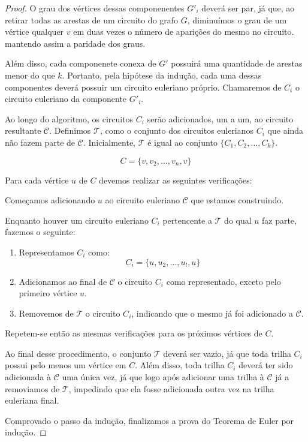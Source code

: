 \documentclass[12pt, a4paper]{article}
\begin{document}
\begin{proof}
O grau dos vértices dessas componenentes $G'_i$ deverá ser par, já que, ao retirar todas as arestas de um circuito do grafo $G$, diminuímos o grau de um vértice qualquer $v$ em duas vezes o número de aparições do mesmo no circuito. mantendo assim a paridade dos graus. 

Além disso, cada componenete conexa de $G'$ possuirá uma quantidade de arestas menor do que $k$.
Portanto, pela hipótese da indução, cada uma dessas componentes deverá possuir um circuito euleriano próprio. 
Chamaremos de $C_i$ o circuito euleriano da componente $G'_i$.

\sloppy Ao longo do algoritmo, os circuitos $C_i$ serão adicionados, um a um, ao circuito resultante $\mathcal{C}$. 
Definimos $\mathcal{T}$, como o conjunto dos circuitos eulerianos $C_i$ que ainda não fazem parte de $\mathcal{C}$. 
Inicialmente, $\mathcal{T}$ é igual ao conjunto $\{C_1, C_2, \dots, C_k\}$.


\[
	C = \{v, v_2, \dots, v_n, v\}
\]

Para cada vértice $u$ de $C$ devemos realizar as seguintes verificações:

\begin{tcolorbox}

Começamos adicionando $u$ ao circuito euleriano $\mathcal{C}$ que estamos construindo.

Enquanto houver um circuito euleriano $C_i$ pertencente a $\mathcal{T}$ do qual $u$ faz parte, fazemos o seguinte:


\begin{enumerate}
    \item Representamos $C_i$ como: 
    \[
        C_i = \{u, u_2, \dots, u_l, u\}
    \]

\item Adicionamos ao final de $\mathcal{C}$ o circuito $C_i$ como representado, exceto pelo primeiro vértice $u$. 

\item Removemos de $\mathcal{T}$ o circuito $C_i$, indicando que o mesmo já foi adicionado a $\mathcal{C}$.

\end{enumerate}

Repetem-se então as mesmas verificações para os próximos vértices de $C$.
\end{tcolorbox}


Ao final desse procedimento, o conjunto $\mathcal{T}$ deverá ser vazio, já que toda trilha $C_i$ possui pelo menos um vértice em $C$. Além disso, toda trilha $C_i$ deverá ter sido adicionada à $\mathcal{C}$ uma única vez, já que logo após adicionar uma trilha à $\mathcal{C}$ já a removiamos de $\mathcal{T}$, impedindo que ela fosse adicionada outra vez na trilha euleriana final.

Comprovado o passo da indução, finalizamos a prova do Teorema de Euler por indução.

\end{proof}
\end{document}

